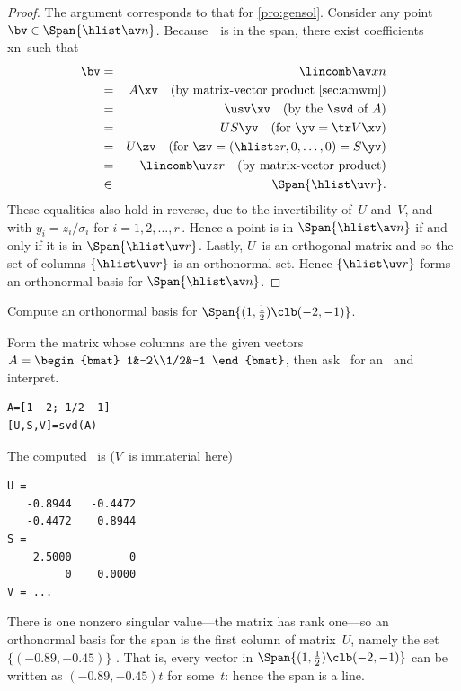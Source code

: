 \begin{proof} 
The argument corresponds to that for \cref{pro:gensol}.
Consider any point \(\bv\in\Span\{\hlist\av n\}\).
Because~\bv\ is in the span, there exist coefficients \hlist xn\ such that
\begin{eqnarray*}
\bv&=&\lincomb \av xn
\\&=&A\xv \quad(\text{by matrix-vector product \cref{sec:amwm}})
\\&=&\usv \xv \quad(\text{by the \svd\ of }A)
\\&=&US \yv \quad(\text{for }\yv=\tr V\xv)
\\&=&U\zv \quad(\text{for }\zv=(\hlist zr,0,\ldots,0)=S\yv)
\\&=&\lincomb \uv z r  \quad(\text{by matrix-vector product})
\\&\in&\Span\{\hlist \uv r\}.
\end{eqnarray*}
These equalities also hold in reverse, due to the invertibility of~\(U\) and~\(V\), and with \(y_i=z_i/\sigma_i\) for \(i=1,2,\ldots,r\)\,.
Hence a point is in \(\Span\{\hlist\av n\}\) if and only if it is in \(\Span\{\hlist \uv r\}\).
Lastly, \(U\)~is an orthogonal matrix and so the set of columns \(\{\hlist \uv r\}\) is an orthonormal set.
Hence \(\{\hlist \uv r\}\) forms an orthonormal basis for \(\Span\{\hlist\av n\}\).
\end{proof}


\begin{example} \label{eg:orthspn2}
Compute an orthonormal basis for \(\Span\{(1,\frac12)\clb(-2,-1)\}\).
\begin{solution} 
Form the matrix whose columns are the given vectors
\(A=\begin{bmat} 1&-2\\1/2&-1 \end{bmat}\),
then ask \script\ for an \svd\ and interpret.
\begin{verbatim}
A=[1 -2; 1/2 -1]
[U,S,V]=svd(A)
\end{verbatim}
\setbox\ajrqrbox\hbox{}%
\marginajrbox%
The computed \svd\ is (\(V\)~is immaterial here)
\begin{verbatim}
U =
   -0.8944   -0.4472
   -0.4472    0.8944
S =
    2.5000         0
         0    0.0000
V = ...
\end{verbatim}
There is one nonzero singular value---the matrix has rank one---so an orthonormal basis for the span is the first column of matrix~\(U\), namely the set \(\{(-0.89,-0.45)\}\) \twodp.
That is, every vector in \(\Span\{(1,\frac12)\clb (-2,-1)\}\) can be written as \((-0.89,-0.45)t\) for some~\(t\): hence the span is a line.
\end{solution}
\end{example}


